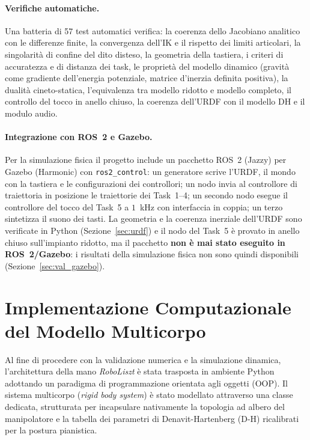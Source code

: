 \paragraph{Verifiche automatiche.} Una batteria di 57 test automatici verifica: la coerenza dello Jacobiano analitico con le differenze finite, la convergenza dell'IK e il rispetto dei limiti articolari, la singolarità di confine del dito disteso, la geometria della tastiera, i criteri di accuratezza e di distanza dei task, le proprietà del modello dinamico (gravità come gradiente dell'energia potenziale, matrice d'inerzia definita positiva), la dualità cineto-statica, l'equivalenza tra modello ridotto e modello completo, il controllo del tocco in anello chiuso, la coerenza dell'URDF con il modello DH e il modulo audio.

\paragraph{Integrazione con ROS~2 e Gazebo.} Per la simulazione fisica il progetto include un pacchetto ROS~2 (Jazzy) per Gazebo (Harmonic) con \texttt{ros2\_control}: un generatore scrive l'URDF, il mondo con la tastiera e le configurazioni dei controllori; un nodo invia al controllore di traiettoria in posizione le traiettorie dei Task~1--4; un secondo nodo esegue il controllore del tocco del Task~5 a $1$~kHz con interfaccia in coppia; un terzo sintetizza il suono dei tasti. La geometria e la coerenza inerziale dell'URDF sono verificate in Python (Sezione~\ref{sec:urdf}) e il nodo del Task~5 è provato in anello chiuso sull'impianto ridotto, ma il pacchetto \textbf{non è mai stato eseguito in ROS~2/Gazebo}: i risultati della simulazione fisica non sono quindi disponibili (Sezione~\ref{sec:val_gazebo}).

\section{Implementazione Computazionale del Modello Multicorpo}

Al fine di procedere con la validazione numerica e la simulazione dinamica, l'architettura della mano \textit{RoboLiszt} è stata trasposta in ambiente Python adottando un paradigma di programmazione orientata agli oggetti (OOP). 
Il sistema multicorpo (\textit{rigid body system}) è stato modellato attraverso una classe dedicata, strutturata per incapsulare nativamente la topologia ad albero del manipolatore e la tabella dei parametri di Denavit-Hartenberg (D-H) ricalibrati per la postura pianistica. 


